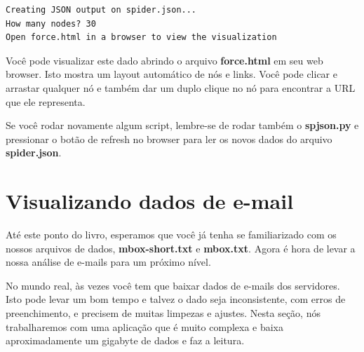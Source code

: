 \beforeverb
\begin{verbatim}
Creating JSON output on spider.json...
How many nodes? 30
Open force.html in a browser to view the visualization
\end{verbatim}
\afterverb
%

Você pode visualizar este dado abrindo o arquivo {\bf force.html} em seu web 
browser. Isto mostra um layout automático de nós e links. Você pode clicar e
arrastar qualquer nó e também dar um duplo clique no nó para encontrar a URL
que ele representa.

Se você rodar novamente algum script, lembre-se de rodar também o 
{\bf spjson.py} e pressionar o botão de refresh no browser para ler
os novos dados do arquivo {\bf spider.json}.

\section{Visualizando dados de e-mail}

Até este ponto do livro, esperamos que você já tenha se familiarizado com os 
nossos arquivos de dados, {\bf mbox-short.txt} e {\bf mbox.txt}. Agora
é hora de levar a nossa análise de e-mails para um próximo nível.

No mundo real, às vezes você tem que baixar dados de e-mails dos servidores.
Isto pode levar um bom tempo e talvez o dado seja inconsistente, com erros
de preenchimento, e precisem de muitas limpezas e ajustes. Nesta seção, nós
trabalharemos com uma aplicação que é muito complexa e baixa aproximadamente
um gigabyte de dados e faz a leitura.

